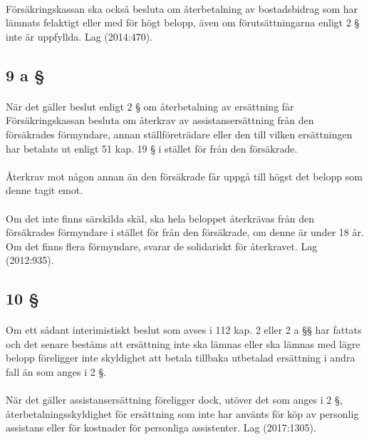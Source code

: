 \documentclass[a4paper,notitlepage,openany,10pt]{book}
\begin{document}
\paragraph*{}
Försäkringskassan ska också besluta om återbetalning av bostadsbidrag som har lämnats felaktigt eller med för högt belopp, även om förutsättningarna enligt 2 § inte är uppfyllda.
Lag (2014:470).
\subsection*{9 a §}
\paragraph*{}
När det gäller beslut enligt 2 § om återbetalning av ersättning får Försäkringskassan besluta om återkrav av assistansersättning från den försäkrades förmyndare, annan ställföreträdare eller den till vilken ersättningen har betalats ut enligt 51 kap. 19 § i stället för från den försäkrade.
\paragraph*{}
Återkrav mot någon annan än den försäkrade får uppgå till högst det belopp som denne tagit emot.
\paragraph*{}
Om det inte finns särskilda skäl, ska hela beloppet återkrävas från den försäkrades förmyndare i stället för från den försäkrade, om denne är under 18 år. Om det finns flera förmyndare, svarar de solidariskt för återkravet.
Lag (2012:935).
\subsection*{10 §}
\paragraph*{}
Om ett sådant interimistiskt beslut som avses i 112 kap. 2 eller 2 a §§ har fattats och det senare bestäms att ersättning inte ska lämnas eller ska lämnas med lägre belopp föreligger inte skyldighet att betala tillbaka utbetalad ersättning i andra fall än som anges i 2 §.
\paragraph*{}
När det gäller assistansersättning föreligger dock, utöver det som anges i 2 §, återbetalningsskyldighet för ersättning som inte har använts för köp av personlig assistans eller för kostnader för personliga assistenter.
Lag (2017:1305).
\end{document}
